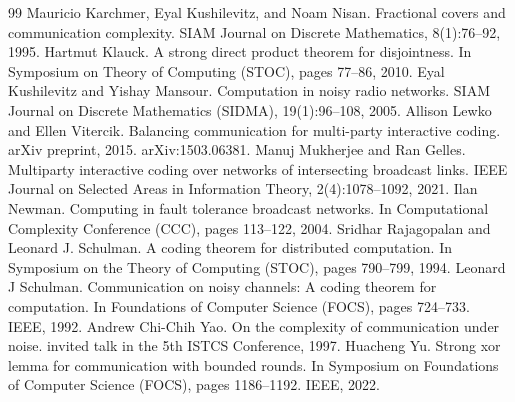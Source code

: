 \documentclass[10pt,a4paper]{article}
\begin{document}
\begin{thebibliography}{99}
 Mauricio Karchmer, Eyal Kushilevitz, and Noam Nisan. Fractional covers and communication complexity. SIAM Journal on Discrete Mathematics, 8(1):76–92, 1995.
 Hartmut Klauck. A strong direct product theorem for disjointness. In Symposium on Theory of Computing (STOC), pages 77–86, 2010.
 Eyal Kushilevitz and Yishay Mansour. Computation in noisy radio networks. SIAM Journal on Discrete Mathematics (SIDMA), 19(1):96–108, 2005.
 Allison Lewko and Ellen Vitercik. Balancing communication for multi-party interactive coding. arXiv preprint, 2015. arXiv:1503.06381.
 Manuj Mukherjee and Ran Gelles. Multiparty interactive coding over networks of intersecting broadcast links. IEEE Journal on Selected Areas in Information Theory, 2(4):1078–1092, 2021.
 Ilan Newman. Computing in fault tolerance broadcast networks. In Computational Complexity Conference (CCC), pages 113–122, 2004.
 Sridhar Rajagopalan and Leonard J. Schulman. A coding theorem for distributed computation. In Symposium on the Theory of Computing (STOC), pages 790–799, 1994.
 Leonard J Schulman. Communication on noisy channels: A coding theorem for computation. In Foundations of Computer Science (FOCS), pages 724–733. IEEE, 1992.
 Andrew Chi-Chih Yao. On the complexity of communication under noise. invited talk in the 5th ISTCS Conference, 1997.
 Huacheng Yu. Strong xor lemma for communication with bounded rounds. In Symposium on Foundations of Computer Science (FOCS), pages 1186–1192. IEEE, 2022.
\end{thebibliography}
\end{document}
